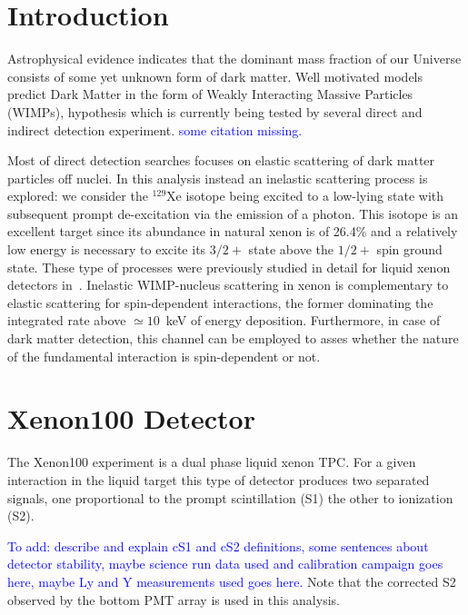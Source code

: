 \section{\label{sec:level1} Introduction}
Astrophysical evidence indicates that the dominant mass fraction of our Universe consists of some yet unknown form
of dark matter. Well motivated models predict Dark Matter in the form of Weakly Interacting Massive Particles (WIMPs),
hypothesis which is currently being tested by several direct and indirect detection experiment. 
\textcolor{blue}{some citation missing.}

Most of direct detection searches focuses on  elastic scattering of dark matter particles off nuclei.
In this analysis instead an inelastic scattering process is explored: we consider the $^{129}\text{Xe}$ isotope being excited to a low-lying state
with subsequent prompt de-excitation via the emission of a photon. This isotope is an excellent target
since its abundance in natural xenon is of 26.4\% and a relatively low energy is necessary to excite its $3/2+$ state above the $1/2+$
spin ground state. These type of processes were previously studied in detail for liquid xenon detectors in~\cite{inelastic_th}.
Inelastic WIMP-nucleus scattering in xenon is complementary to elastic scattering for spin-dependent interactions,
the former dominating the integrated rate above  $\simeq10$~keV of energy deposition.
Furthermore, in case of dark matter detection, this channel can be employed to asses whether the nature of the fundamental interaction
is spin-dependent or not.


\section{Xenon100 Detector}
The Xenon100 experiment is a  dual phase liquid xenon TPC. For a given interaction in the liquid target this type of detector produces two separated signals,
one proportional to the prompt scintillation (S1) the other to ionization (S2).

\textcolor{blue}{To add: describe and explain cS1 and cS2 definitions, some sentences about detector stability, maybe science run data used and calibration campaign goes here, 
maybe Ly and Y measurements used goes here.} 
Note that the corrected S2 observed by the bottom PMT array is used in this analysis.  

